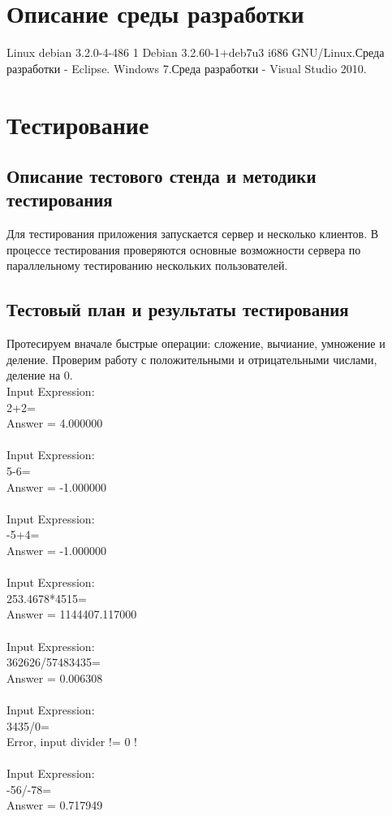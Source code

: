 \documentclass[12pt,a4paper]{report}
\begin{document}
\section*{Описание среды разработки}
Linux debian 3.2.0-4-486 1 Debian 3.2.60-1+deb7u3 i686 GNU/Linux.\newline Среда разработки - Eclipse.\newline
Windows 7.\newline Среда разработки - Visual Studio 2010.
\section{Тестирование}
\subsection{Описание тестового стенда и методики тестирования}
Для тестирования приложения запускается сервер и несколько клиентов. В процессе тестирования проверяются основные возможности сервера по параллельному тестированию нескольких пользователей.
\subsection{Тестовый план и результаты тестирования}
Протесируем вначале быстрые операции: сложение, вычиание, умножение и деление. Проверим работу с положительными и отрицательными числами, деление на 0.\\
Input Expression:\\
2+2=\\
Answer = 4.000000\\
\\
Input Expression:\\
5-6=\\
Answer = -1.000000\\
\\
Input Expression:\\
-5+4=\\
Answer = -1.000000\\
\\
Input Expression:\\
253.4678*4515=\\
Answer = 1144407.117000\\
\\
Input Expression:\\
362626/57483435=\\
Answer = 0.006308\\
\\
Input Expression:\\
3435/0=\\
Error, input divider != 0 !\\
\\
Input Expression:\\
-56/-78=\\
Answer = 0.717949\\
\end{document}
